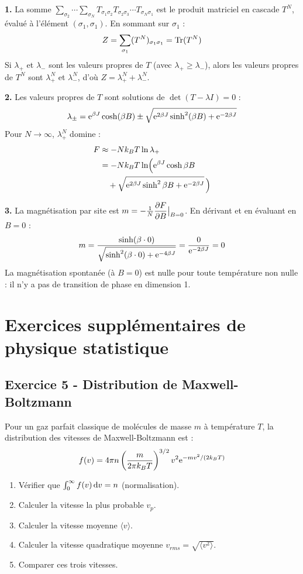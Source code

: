 \documentclass[12pt,a4paper]{article}
\begin{document}
\begin{boitecorrige}
\textbf{1.} La somme $\sum_{\sigma_2}\cdots\sum_{\sigma_N}T_{\sigma_1\sigma_2}T_{\sigma_2\sigma_3}\cdots T_{\sigma_N\sigma_1}$ est le produit matriciel en cascade $T^N$, évalué à l'élément $(\sigma_1,\sigma_1)$. En sommant sur $\sigma_1$ :
\[
Z = \sum_{\sigma_1}(T^N)_{\sigma_1\sigma_1} = \mathrm{Tr}(T^N)
\]
Si $\lambda_+$ et $\lambda_-$ sont les valeurs propres de $T$ (avec $\lambda_+\geq\lambda_-$), alors les valeurs propres de $T^N$ sont $\lambda_+^N$ et $\lambda_-^N$, d'où $Z = \lambda_+^N + \lambda_-^N$.

\textbf{2.} Les valeurs propres de $T$ sont solutions de $\det(T-\lambda I)=0$ :
\[
\lambda_\pm = \mathrm{e}^{\beta J}\cosh(\beta B) \pm \sqrt{\mathrm{e}^{2\beta J}\sinh^2(\beta B) + \mathrm{e}^{-2\beta J}}
\]
Pour $N\to\infty$, $\lambda_+^N$ domine :
\begin{align*}
F &\approx -Nk_BT\ln\lambda_+ \\
&= -Nk_BT\ln\!\Big(\mathrm{e}^{\beta J}\cosh\beta B \\
&\quad + \sqrt{\mathrm{e}^{2\beta J}\sinh^2\beta B + \mathrm{e}^{-2\beta J}}\,\Big)
\end{align*}

\textbf{3.} La magnétisation par site est $m = -\frac{1}{N}\dfrac{\partial F}{\partial B}\big|_{B=0}$. En dérivant et en évaluant en $B=0$ :
\[
m = \frac{\sinh(\beta\cdot 0)}{\sqrt{\sinh^2(\beta\cdot0)+\mathrm{e}^{-4\beta J}}} = \frac{0}{\mathrm{e}^{-2\beta J}} = 0
\]
La magnétisation spontanée (à $B=0$) est nulle pour toute température non nulle : il n'y a pas de transition de phase en dimension 1.
\end{boitecorrige}


\newpage
\section{Exercices supplémentaires de physique statistique}

\subsection*{Exercice 5 - Distribution de Maxwell-Boltzmann \niveau{\moyen}}

\begin{boiteexercice}
Pour un gaz parfait classique de molécules de masse $m$ à température $T$, la distribution des vitesses de Maxwell-Boltzmann est :
\[
f(v) = 4\pi n\left(\frac{m}{2\pi k_BT}\right)^{3/2}v^2\mathrm{e}^{-mv^2/(2k_BT)}
\]
\begin{enumerate}
  \item Vérifier que $\int_0^\infty f(v)\,\mathrm{d} v = n$ (normalisation).
  \item Calculer la vitesse la plus probable $v_p$.
  \item Calculer la vitesse moyenne $\langle v\rangle$.
  \item Calculer la vitesse quadratique moyenne $v_{rms} = \sqrt{\langle v^2\rangle}$.
  \item Comparer ces trois vitesses.
\end{enumerate}
\end{boiteexercice}
\end{document}
